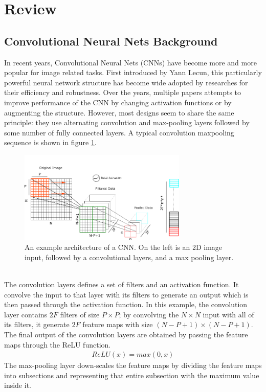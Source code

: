 \section{Review}
\subsection{Convolutional Neural Nets Background}
In recent years, Convolutional Neural Nets (CNNs) have become more and more popular for image related tasks. First introduced by Yann Lecun, this particularly powerful neural network structure has become wide adopted by researches for their efficiency and robustness. Over the years, multiple papers attempts to improve performance of the CNN by changing activation functions or by augmenting the structure. However, most designs seem to share the same principle: they use alternating convolution and max-pooling layers followed by some number of fully connected layers. A typical convolution maxpooling sequence is shown in figure \ref{fig:cnn}. \\
\begin{figure}[hb]
	\includegraphics[width = 8cm]{img/CNN.png}
    \caption{\label{fig:cnn}
    An example architecture of a CNN.
    On the left is an 2D image input, followed by a convolutional layers, and a 
    max pooling layer. }
\end{figure}\\
The convolution layers defines a set of filters and an activation function. It convolve the input to that layer with its filters to generate an output which is then passed through the activation function. In this example, the convolution layer contains $2F$ filters of size $P\times P$; by convolving the $N\times N$ input with all of its filters, it generate $2F$ feature maps with size $(N-P+1)\times (N-P+1)$. The final output of the convolution layers are obtained by passing the feature maps through the ReLU function.
\begin{align}
	ReLU(x) = max(0,x)
\end{align}
The max-pooling layer down-scales the feature maps by dividing the feature maps into subsections and representing that entire subsection with the maximum value inside it.\\

